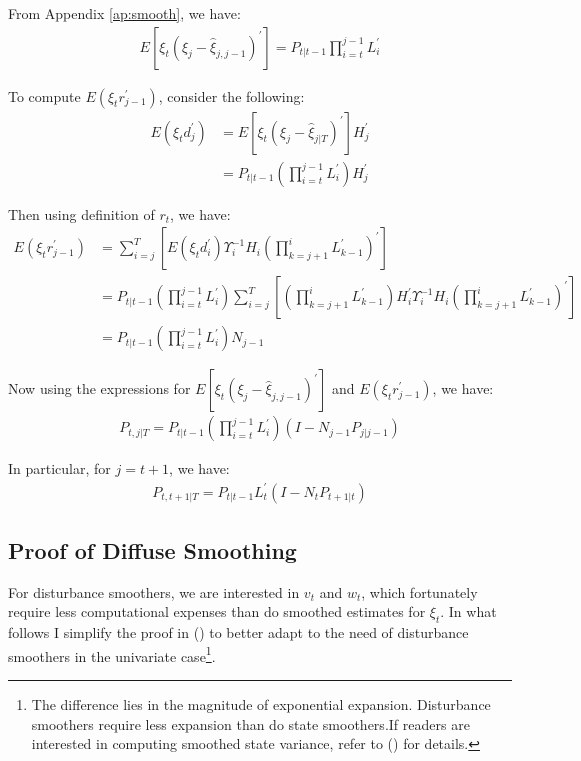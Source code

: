 \documentclass[12pt]{article}
\numberwithin{equation}{section}
\begin{document}
From Appendix \ref{ap:smooth}, we have:
\begin{align*}
    E[\xi_t(\xi_{j}-\hat{\xi}_{j,j-1})^{'}] = P_{t|t-1}\prod_{i=t}^{j-1}L_i^{'}
\end{align*}

To compute $E(\xi_tr_{j-1}^{'})$, consider the following:
\begin{align*}
    E(\xi_td_j^{'}) &= E[\xi_t(\xi_j - \hat{\xi}_{j|T})^{'}]H_j^{'} \\
    &= P_{t|t-1}\left(\prod_{i=t}^{j-1}L_i^{'}\right)H_j^{'}
\end{align*}

Then using definition of $r_t$, we have:
\begin{align*}
    E(\xi_tr_{j-1}^{'}) &= \sum_{i=j}^{T}\left[E(\xi_td_i^{'})\Upsilon_i^{-1}H_i\left(\prod_{k=j+1}^{i}L_{k-1}^{'}\right)^{'}\right] \\
    &= P_{t|t-1}\left(\prod_{i=t}^{j-1}L_i^{'}\right)\sum_{i=j}^{T}\left[\left(\prod_{k=j+1}^{i}L_{k-1}^{'}\right)H_i^{'}\Upsilon_i^{-1}H_i\left(\prod_{k=j+1}^{i}L_{k-1}^{'}\right)^{'}\right] \\
    &= P_{t|t-1}\left(\prod_{i=t}^{j-1}L_i^{'}\right)N_{j-1}
\end{align*}

Now using the expressions for $E[\xi_t(\xi_{j}-\hat{\xi}_{j,j-1})^{'}]$ and $E(\xi_tr_{j-1}^{'})$, we have:
\begin{align*}
    P_{t,j|T} = P_{t|t-1}\left(\prod_{i=t}^{j-1}L_i^{'}\right)(I-N_{j-1}P_{j|j-1})
\end{align*}

In particular, for $j=t+1$, we have:
\begin{align*}
    P_{t,t+1|T} = P_{t|t-1}L_{t}^{'}(I-N_{t}P_{t+1|t})
\end{align*}

\subsection{Proof of Diffuse Smoothing} \label{ap:init_smoother}
For disturbance smoothers, we are interested in $v_t$ and $w_t$, which fortunately require less computational expenses than do smoothed estimates for $\xi_t$. In what follows I simplify the proof in (\cite{durbin_koopman_2003}) to better adapt to the need of disturbance smoothers in the univariate case\footnote{The difference lies in the magnitude of exponential expansion. Disturbance smoothers require less expansion than do state smoothers.If readers are interested in computing smoothed state variance, refer to (\cite{durbin_koopman_2003}) for details.}. 
\end{document}
